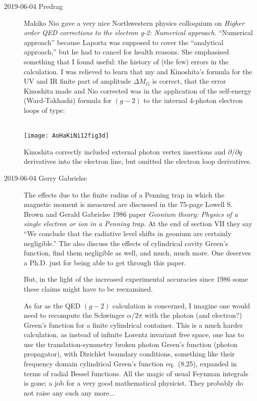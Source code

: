 \begin{description}
\item[2019-06-04 Predrag]
Makiko Nio gave a very nice Northwestern
{physics colloquium} on
{\em Higher order QED corrections to the electron g-2: Numerical
approach}. ``Numerical approach'' because Laporta was supposed to cover
the ``analytical approach,'' but he had to cancel for health reasons. She
emphasised something that I found useful: the history of (the few) errors
in the calculation. I was relieved to learn that my and Kinoshita's
formula  for the UV and IR finite part of
amplitude $\Delta M_G$ is correct, that the error Kinoshita made
and Nio corrected was in the application of the self-energy (Ward-Takhashi)
formula for $(g-2)$ to the internal 4-photon electron loops of type:
\\\\
\centerline{\texttt{[image: AoHaKiNi12fig3d]}}

Kinoshita correctly included external photon vertex insertions and
$\partial/\partial q$ derivatives into the electron line, but omitted the
electron loop derivatives.

\item[2019-06-04 Gerry Gabrielse]
The effects due to the finite radius of a Penning trap in which
the magnetic moment is measured are discussed in the 75-page
Lowell S. Brown and 
{Gerald Gabrielse} 1986 paper
{\em Geonium theory: {Physics} of a single electron or ion in a {Penning} trap}.
At the end of section VII they say ``We conclude that the radiative
level shifts in geonium are certainly negligible.'' The also discuss
the effects of cylindrical cavity Green's function, find them negligible
as well, and much, much more. One deserves a Ph.D. just for being able to
get through this paper.

But, in the light of the increased experimental accuracies since 1986
some these claims might have to be reexamined.

As far as the QED $(g-2)$ calculation is concerned, I imagine one would
need to recompute the Schwinger $\alpha/2\pi$ with the photon (and
electron?) Green's function for a finite cylindrical container. This is a
much harder calculation, as instead of infinite Lorentz invariant free
space, one has to use the translation-symmetry broken photon Green's
function (photon propagator), with Dirichlet boundary conditions,
something like their frequency domain cylindrical Green's function
eq.~(8.25), expanded in terms of radial Bessel functions. All the magic
of usual Feynman integrals is gone; a job for a very good mathematical
physicist. They probably do not raise any such any more...


\end{description}
